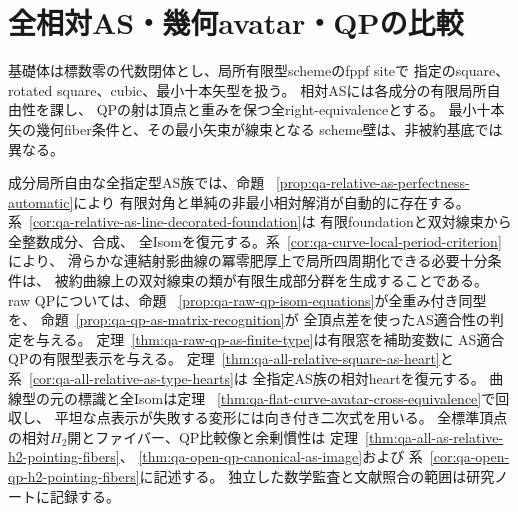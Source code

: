 \documentclass[a4paper,11pt]{ltjsarticle}
\numberwithin{equation}{section}
\theoremstyle{plain}
\theoremstyle{definition}
\theoremstyle{remark}
\begin{document}
\section{全相対AS・幾何avatar・QPの比較}
\label{sec:qa-remaining}
\label{prob:qa-all-relative-as-avatar-qp-stacks}

基礎体は標数零の代数閉体とし、局所有限型schemeのfppf siteで
指定のsquare、rotated square、cubic、最小十本矢型を扱う。
相対ASには各成分の有限局所自由性を課し、
QPの射は頂点と重みを保つ全right-equivalenceとする。
最小十本矢の幾何fiber条件と、その最小矢束が線束となる
scheme壁は、非被約基底では異なる。

成分局所自由な全指定型AS族では、命題~
\ref{prop:qa-relative-as-perfectness-automatic}により
有限対角と単純の非最小相対解消が自動的に存在する。
系~\ref{cor:qa-relative-as-line-decorated-foundation}は
有限foundationと双対線束から全整数成分、合成、
全Isomを復元する。系~\ref{cor:qa-curve-local-period-criterion}により、
滑らかな連結射影曲線の冪零肥厚上で局所四周期化できる必要十分条件は、
被約曲線上の双対線束の類が有限生成部分群を生成することである。
raw QPについては、命題~
\ref{prop:qa-raw-qp-isom-equations}が全重み付き同型を、
命題~\ref{prop:qa-qp-as-matrix-recognition}が
全頂点差を使ったAS適合性の判定を与える。
定理~\ref{thm:qa-raw-qp-as-finite-type}は有限窓を補助変数に
AS適合QPの有限型表示を与える。
定理~\ref{thm:qa-all-relative-square-as-heart}と
系~\ref{cor:qa-all-relative-as-type-hearts}は
全指定AS族の相対heartを復元する。
曲線型の元の標識と全Isomは定理~
\ref{thm:qa-flat-curve-avatar-cross-equivalence}で回収し、
平坦な点表示が失敗する変形には向き付き二次式を用いる。
全標準頂点の相対$H_2$開とファイバー、QP比較像と余剰慣性は
定理~\ref{thm:qa-all-as-relative-h2-pointing-fibers}、
\ref{thm:qa-open-qp-canonical-as-image}および
系~\ref{cor:qa-open-qp-h2-pointing-fibers}に記述する。
独立した数学監査と文献照合の範囲は研究ノートに記録する。
\end{document}
